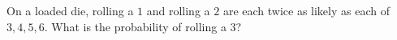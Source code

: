 On a loaded die, rolling a $1$ and rolling a $2$ are each twice as likely as each of $3,4,5,6$. What is the probability of rolling a $3$?
